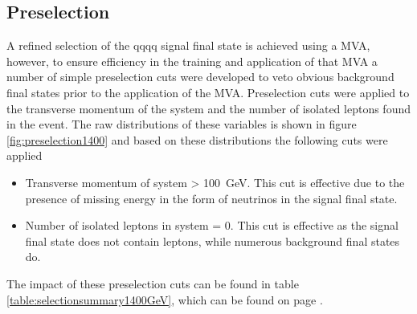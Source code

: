 \subsection{Preselection}
\label{sec:preselection1400GeV}
A refined selection of the \nu{\nu}qqqq signal final state is achieved using a MVA, however, to ensure efficiency in the training and application of that MVA a number of simple preselection cuts were developed to veto obvious background final states prior to the application of the MVA.  Preselection cuts were applied to the transverse momentum of the system and the number of isolated leptons found in the event.  The raw distributions of these variables is shown in figure \ref{fig:preselection1400} and based on these distributions the following cuts were applied
%
\begin{itemize}
\item Transverse momentum of system > 100~GeV.  This cut is effective due to the presence of missing energy in the form of neutrinos in the signal final state.
\item Number of isolated leptons in system = 0.  This cut is effective as the signal final state does not contain leptons, while numerous background final states do.  
\end{itemize}
%
\noindent The impact of these preselection cuts can be found in table \ref{table:selectionsummary1400GeV}, which can be found on page \pageref{table:selectionsummary1400GeV}.

